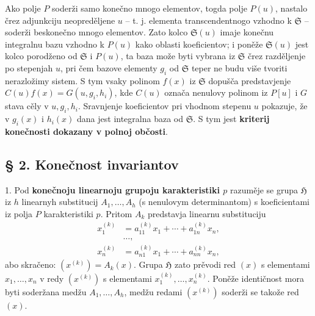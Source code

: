 \documentclass[11pt]{article}
\begin{document}
Ako polje $P$ soderži samo konečno mnogo elementov, togda polje $P(u)$, nastalo črez adjunkciju neopreděljene $u$ -- t. j. elementa transcendentnogo vzhodno k $\mathfrak S$ -- soderži beskonečno mnogo elementov. Zato kolco $\mathfrak S(u)$ imaje konečnu integralnu bazu vzhodno k $P(u)$ kako oblasti koeficientov; i poněže $\mathfrak S(u)$ jest kolco porodženo od $\mathfrak S$ i $P(u)$, ta baza može byti vybrana iz $\mathfrak S$ črez razděljenje po stepenjah $u$, pri čem bazove elementy $g_i$ od $\mathfrak S$ teper ne budu više tvoriti nerazložimy sistem. S tym vsaky polinom $f(x)$ iz $\mathfrak S$ dopušča predstavjenje $C(u)f(x)=G(u,g_i,h_i)$, kde $C(u)$ označa nenulovy polinom iz $P[u]$ i $G$ stava cěly v $u,g_i,h_i$. Sravnjenje koeficientov pri vhodnom stepenu $u$ pokazuje, že v $g_i(x)$ i $h_i(x)$ dana jest integralna baza od $\mathfrak S$. S tym jest \textbf{kriterij konečnosti dokazany v polnoj občosti}.

\subsection*{§ 2. Konečnost invariantov}

1. Pod \textbf{konečnoju linearnoju grupoju karakteristiki $p$} razuměje se grupa $\mathfrak H$ iz $h$ linearnyh substitucij $A_1,\ldots,A_h$ (s nenulovym determinantom) s koeficientami iz polja $P$ karakteristiki $p$. Pritom $A_k$ predstavja linearnu substituciju
\[
\begin{aligned}
 x_1^{(k)}&=a_{11}^{(k)}x_1+\cdots+a_{1n}^{(k)}x_n,\\[-0.2em]
 &\ldots,\\
 x_n^{(k)}&=a_{n1}^{(k)}x_1+\cdots+a_{nn}^{(k)}x_n,
\end{aligned}
\]
abo skračeno: $(x^{(k)})=A_k(x)$. Grupa $\mathfrak H$ zato prěvodi red $(x)$ s elementami $x_1,\ldots,x_n$ v redy $(x^{(k)})$ s elementami $x_1^{(k)},\ldots,x_n^{(k)}$. Poněže identičnost mora byti soderžana medžu $A_1,\ldots,A_h$, medžu redami $(x^{(k)})$ soderži se takože red $(x)$.
\end{document}
